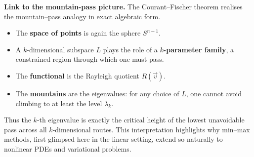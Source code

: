 \noindent\textbf{Link to the mountain-pass picture.}
The Courant--Fischer theorem realises the mountain–pass analogy in exact algebraic form.  
\begin{itemize}
    \item The \textbf{space of points} is again the sphere $S^{n-1}$.  
    \item A $k$-dimensional subspace $L$ plays the role of a \textbf{$k$-parameter family}, a constrained region through which one must pass.  
    \item The \textbf{functional} is the Rayleigh quotient $R(\vec v)$.  
    \item The \textbf{mountains} are the eigenvalues: for any choice of $L$, one cannot avoid climbing to at least the level $\lambda_k$.  
\end{itemize}
Thus the $k$-th eigenvalue is exactly the critical height of the lowest unavoidable pass across all $k$-dimensional routes. This interpretation highlights why min–max methods, first glimpsed here in the linear setting, extend so naturally to nonlinear PDEs and variational problems.


